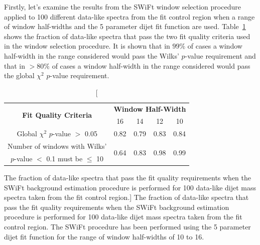 Firstly, let's examine the results from the SWiFt window selection procedure applied to 100 different data-like spectra from the fit control region
when a range of window half-widths and the 5 parameter dijet fit function are used.
Table~\ref{tab:windowSel_dataLike} shows the fraction of data-like spectra that pass the two fit quality criteria used in the window selection procedure.
It is shown that in $99\%$ of cases a window half-width in the range considered would pass the Wilks' \mbox{$p$-value} requirement
and that in $>80\%$ of cases a window half-width in the range considered would pass the global $\chi^{2}$ \mbox{$p$-value} requirement.

{\renewcommand{\arraystretch}{1.3}
\begin{table}[!htb]
\centering
\begin{tabular}{|c||c|c|c|c|}
\hline
 \multirow{2}{*}{\textbf{Fit Quality Criteria}} & \multicolumn{4}{c|}{\textbf{Window Half-Width}} \\ \cline{2-5} 
                                                & 16 & 14 & 12 & 10 \\ \hline
\multirow{2}{*}{Global $\chi^2$ $p$-value $>$ 0.05} & \multirow{2}{*}{0.82} & \multirow{2}{*}{0.79} & \multirow{2}{*}{0.83} & \multirow{2}{*}{0.84} \\
 &  &  &  &  \\ \hline
Number of windows with Wilks' & \multirow{2}{*}{0.64} & \multirow{2}{*}{0.83} & \multirow{2}{*}{0.98} & \multirow{2}{*}{0.99} \\
\mbox{$p$-value} $<$ 0.1 must be $\leq$ 10 &  &  &  &  \\ \hline
\end{tabular}
\caption
    [The fraction of data-like spectra that pass the fit quality requirements when the SWiFt background estimation procedure is performed for
      100 data-like dijet mass spectra taken from the \lm{} fit control region.]
    {The fraction of data-like spectra that pass the fit quality requirements when the SWiFt background estimation procedure is performed for
      100 data-like dijet mass spectra taken from the \lm{} fit control region.
      The SWiFt procedure has been performed using the 5 parameter dijet fit function
      for the range of window half-widths of 10 to 16.}
\label{tab:windowSel_dataLike}
\end{table}
\vspace{-1em}
}

